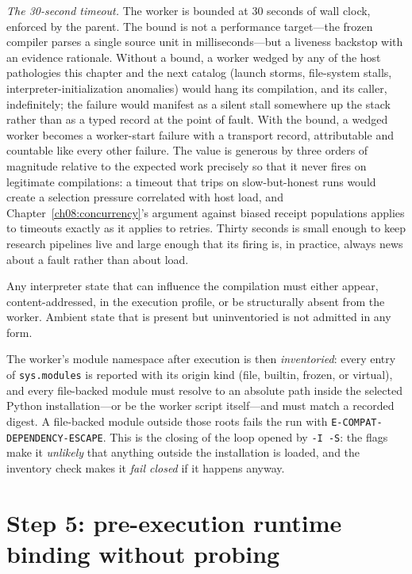 \emph{The 30-second timeout.} The worker is bounded at 30 seconds of wall clock, enforced by the parent. The bound is not a performance target---the frozen compiler parses a single source unit in milliseconds---but a liveness backstop with an evidence rationale. Without a bound, a worker wedged by any of the host pathologies this chapter and the next catalog (launch storms, file-system stalls, interpreter-initialization anomalies) would hang its compilation, and its caller, indefinitely; the failure would manifest as a silent stall somewhere up the stack rather than as a typed record at the point of fault. With the bound, a wedged worker becomes a worker-start failure with a transport record, attributable and countable like every other failure. The value is generous by three orders of magnitude relative to the expected work precisely so that it never fires on legitimate compilations: a timeout that trips on slow-but-honest runs would create a selection pressure correlated with host load, and Chapter~\ref{ch08:concurrency}'s argument against biased receipt populations applies to timeouts exactly as it applies to retries. Thirty seconds is small enough to keep research pipelines live and large enough that its firing is, in practice, always news about a fault rather than about load.

\begin{ruleenv}\label{ch07:rule:state}
Any interpreter state that can influence the compilation must either appear, content-addressed, in the execution profile, or be structurally absent from the worker. Ambient state that is present but uninventoried is not admitted in any form.
\end{ruleenv}

The worker's module namespace after execution is then \emph{inventoried}: every entry of \texttt{sys.modules} is reported with its origin kind (file, builtin, frozen, or virtual), and every file-backed module must resolve to an absolute path inside the selected Python installation---or be the worker script itself---and must match a recorded digest. A file-backed module outside those roots fails the run with \texttt{E-COMPAT-DEPENDENCY-ESCAPE}. This is the closing of the loop opened by \texttt{-I -S}: the flags make it \emph{unlikely} that anything outside the installation is loaded, and the inventory check makes it \emph{fail closed} if it happens anyway.

\section{Step 5: pre-execution runtime binding without probing}\label{ch07:step5}

